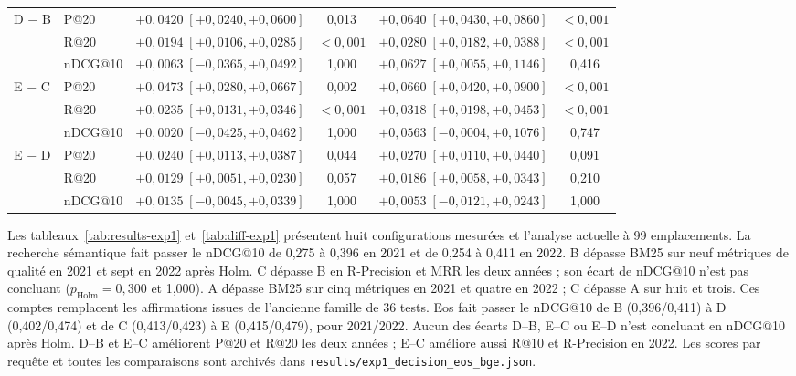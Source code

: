 \documentclass{article}
\begin{document}
\begin{table}[t]
\begin{tabular}{llcccc}
    \midrule
    D $-$ B & P@20 & $+0{,}0420\;[+0{,}0240, +0{,}0600]$ & 0{,}013 & $+0{,}0640\;[+0{,}0430, +0{,}0860]$ & $<0{,}001$ \\
     & R@20 & $+0{,}0194\;[+0{,}0106, +0{,}0285]$ & $<0{,}001$ & $+0{,}0280\;[+0{,}0182, +0{,}0388]$ & $<0{,}001$ \\
     & nDCG@10 & $+0{,}0063\;[-0{,}0365, +0{,}0492]$ & 1{,}000 & $+0{,}0627\;[+0{,}0055, +0{,}1146]$ & 0{,}416 \\
    \midrule
    E $-$ C & P@20 & $+0{,}0473\;[+0{,}0280, +0{,}0667]$ & 0{,}002 & $+0{,}0660\;[+0{,}0420, +0{,}0900]$ & $<0{,}001$ \\
     & R@20 & $+0{,}0235\;[+0{,}0131, +0{,}0346]$ & $<0{,}001$ & $+0{,}0318\;[+0{,}0198, +0{,}0453]$ & $<0{,}001$ \\
     & nDCG@10 & $+0{,}0020\;[-0{,}0425, +0{,}0462]$ & 1{,}000 & $+0{,}0563\;[-0{,}0004, +0{,}1076]$ & 0{,}747 \\
    \midrule
    E $-$ D & P@20 & $+0{,}0240\;[+0{,}0113, +0{,}0387]$ & 0{,}044 & $+0{,}0270\;[+0{,}0110, +0{,}0440]$ & 0{,}091 \\
     & R@20 & $+0{,}0129\;[+0{,}0051, +0{,}0230]$ & 0{,}057 & $+0{,}0186\;[+0{,}0058, +0{,}0343]$ & 0{,}210 \\
     & nDCG@10 & $+0{,}0135\;[-0{,}0045, +0{,}0339]$ & 1{,}000 & $+0{,}0053\;[-0{,}0121, +0{,}0243]$ & 1{,}000 \\
    \bottomrule
  \end{tabular}
\end{table}

Les tableaux~\ref{tab:results-exp1} et~\ref{tab:diff-exp1} présentent huit configurations mesurées et l'analyse actuelle à 99 emplacements. La recherche sémantique fait passer le nDCG@10 de 0,275 à 0,396 en 2021 et de 0,254 à 0,411 en 2022. B dépasse BM25 sur neuf métriques de qualité en 2021 et sept en 2022 après Holm. C dépasse B en R-Precision et MRR les deux années ; son écart de nDCG@10 n'est pas concluant ($p_{\mathrm{Holm}}=0{,}300$ et 1,000). A dépasse BM25 sur cinq métriques en 2021 et quatre en 2022 ; C dépasse A sur huit et trois. Ces comptes remplacent les affirmations issues de l'ancienne famille de 36 tests. Eos fait passer le nDCG@10 de B (0,396/0,411) à D (0,402/0,474) et de C (0,413/0,423) à E (0,415/0,479), pour 2021/2022. Aucun des écarts D--B, E--C ou E--D n'est concluant en nDCG@10 après Holm. D--B et E--C améliorent P@20 et R@20 les deux années ; E--C améliore aussi R@10 et R-Precision en 2022. Les scores par requête et toutes les comparaisons sont archivés dans \texttt{results/exp1\_decision\_eos\_bge.json}.
\end{document}
